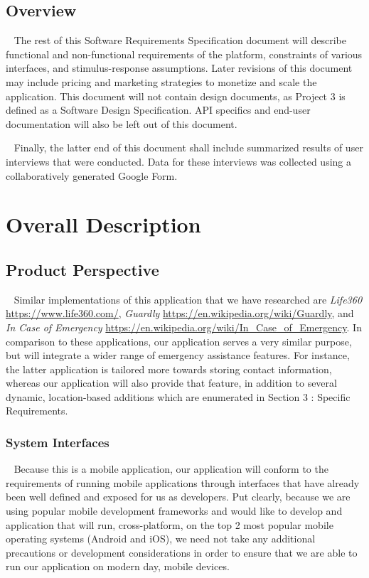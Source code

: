 \documentclass{scrreprt}
\begin{document}
\section{Overview}
\par ~ The rest of this Software Requirements Specification document will describe functional and non-functional requirements of the platform, constraints of various interfaces, and stimulus-response assumptions. Later revisions of this document may include pricing and marketing strategies to monetize and scale the application. This document will not contain design documents, as Project 3 is defined as a Software Design Specification. API specifics and end-user documentation will also be left out of this document. 

\par ~ Finally, the latter end of this document shall include summarized results of user interviews that were conducted. Data for these interviews was collected using a collaboratively generated Google Form.


\chapter{Overall Description}


\section{Product Perspective}
\par ~ Similar implementations of this application that we have researched are \textit{Life360} \url{https://www.life360.com/}, \textit{Guardly} \url{https://en.wikipedia.org/wiki/Guardly}, and \textit{In Case of Emergency} \url{https://en.wikipedia.org/wiki/In_Case_of_Emergency}. In comparison to these applications, our application serves a very similar purpose, but will integrate a wider range of emergency assistance features. For instance, the latter application is tailored more towards storing contact information, whereas our application will also provide that feature, in addition to several dynamic, location-based additions which are enumerated in Section 3 : Specific Requirements.


\subsection{System Interfaces}
\par ~ Because this is a mobile application, our application will conform to the requirements of running mobile applications through interfaces that have already been well defined and exposed for us as developers. Put clearly, because we are using popular mobile development frameworks and would like to develop and application that will run, cross-platform, on the top 2 most popular mobile operating systems (Android and iOS), we need not take any additional precautions or development considerations in order to ensure that we are able to run our application on modern day, mobile devices.
\end{document}
